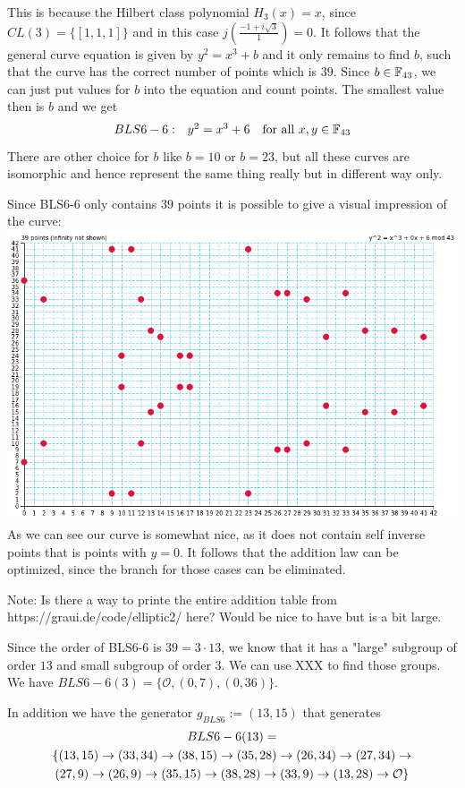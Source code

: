 This is because the Hilbert class polynomial $H_3(x)=x$, since $CL(3) = \{[1,1,1]\}$ and in this case $j(\frac{-1 + i \sqrt{3}}{1})=0$. It follows that the general curve equation is given by $y^2 = x^3 +b$ and it only remains to find $b$, such that the curve has the correct number of points which is $39$. Since $b\in \mathbb{F}_{43}$, we can just put values for $b$ into the equation and count points. The smallest value then is $b$ and we get
$$
\begin{array}{lcrr}
BLS6-6: & y^2 = x^3 + 6& \text{for all } x,y \in \mathbb{F}_{43}
\end{array}
$$
There are other choice for $b$ like $b=10$ or $b=23$, but all these curves are isomorphic and hence represent the same thing really but in different way only.

Since BLS6-6 only contains $39$ points it is possible to give a visual impression of the curve:
\includegraphics[scale=0.6]{figures/bls6-6.png}
As we can see our curve is somewhat nice, as it does not contain self inverse points that is points with $y=0$. It follows that the addition law can be optimized, since the branch for those cases can be eliminated. 

Note: Is there a way to printe the entire addition table from https://graui.de/code/elliptic2/ here? Would be nice to have but is a bit large.

Since the order of BLS6-6 is $39= 3\cdot 13$, we know that it has a "large" subgroup of order $13$ and small subgroup of order $3$. We can use XXX to find those groups. We have $BLS6-6(3)=\{\mathcal{O},(0,7),(0,36)\}$.

In addition we have the generator $g_{BLS6}:=(13,15)$ that generates
\begin{multline}
BLS6-6(13)=\\
\{(13,15) \rightarrow (33,34) \rightarrow  (38,15) \rightarrow  (35,28) \rightarrow (26,34) \rightarrow  (27,34) \rightarrow  \\ 
(27,9)  \rightarrow  (26,9) \rightarrow  (35,15) \rightarrow  (38,28) \rightarrow  (33,9) \rightarrow (13,28) \rightarrow  \mathcal{O}\}$$
\end{multline}

